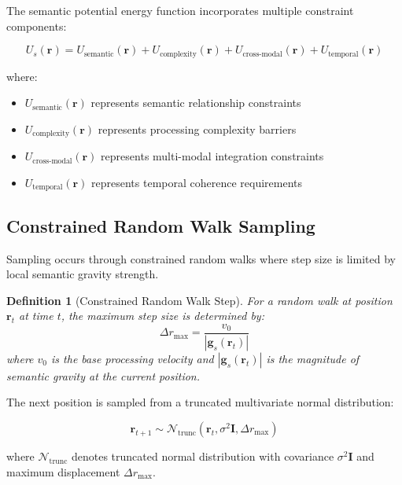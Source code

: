 \documentclass[12pt,a4paper]{article}
\newtheorem{definition}{Definition}
\begin{document}
The semantic potential energy function incorporates multiple constraint components:

\begin{equation}
U_s(\mathbf{r}) = U_{\text{semantic}}(\mathbf{r}) + U_{\text{complexity}}(\mathbf{r}) + U_{\text{cross-modal}}(\mathbf{r}) + U_{\text{temporal}}(\mathbf{r})
\end{equation}

where:
\begin{itemize}
\item $U_{\text{semantic}}(\mathbf{r})$ represents semantic relationship constraints
\item $U_{\text{complexity}}(\mathbf{r})$ represents processing complexity barriers
\item $U_{\text{cross-modal}}(\mathbf{r})$ represents multi-modal integration constraints
\item $U_{\text{temporal}}(\mathbf{r})$ represents temporal coherence requirements
\end{itemize}

\subsection{Constrained Random Walk Sampling}

Sampling occurs through constrained random walks where step size is limited by local semantic gravity strength.

\begin{definition}[Constrained Random Walk Step]
For a random walk at position $\mathbf{r}_t$ at time $t$, the maximum step size is determined by:
\begin{equation}
\Delta r_{\max} = \frac{v_0}{|\mathbf{g}_s(\mathbf{r}_t)|}
\end{equation}
where $v_0$ is the base processing velocity and $|\mathbf{g}_s(\mathbf{r}_t)|$ is the magnitude of semantic gravity at the current position.
\end{definition}

The next position is sampled from a truncated multivariate normal distribution:

\begin{equation}
\mathbf{r}_{t+1} \sim \mathcal{N}_{\text{trunc}}(\mathbf{r}_t, \sigma^2 \mathbf{I}, \Delta r_{\max})
\end{equation}

where $\mathcal{N}_{\text{trunc}}$ denotes truncated normal distribution with covariance $\sigma^2 \mathbf{I}$ and maximum displacement $\Delta r_{\max}$.
\end{document}
